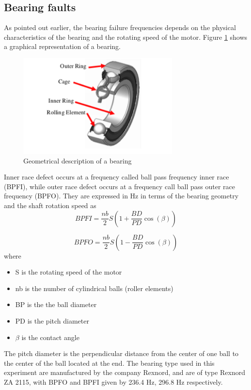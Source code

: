 \documentclass[../Main/thesis.tex]{subfiles}
\begin{document}


\subsection{Bearing faults}
\label{sec:fault}
As pointed out earlier, the bearing failure frequencies depends on the physical characteristics of the bearing and the rotating speed of the motor. Figure \ref{fig:bearing} shows a graphical representation of a bearing.
\begin{figure}[H] %
   \centering
   \includegraphics[width=3.2in]{../fig/bearing}  
   \caption{Geometrical description of a bearing}
   \label{fig:bearing}
\end{figure}
\justify
 Inner race defect occurs at a frequency called ball pass frequency inner race (BPFI), while outer race defect occurs at a frequency call ball pass outer race frequency (BPFO). They are expressed in Hz in terms of the bearing geometry and the shaft rotation speed as 
\begin{equation}\label{eq:bpfi}
BPFI = \frac{nb}{2}S\left( 1 +  \frac{BD}{PD}\cos(\beta)  \right)
\end{equation}

\begin{equation}\label{eq:bpfo}
BPFO = \frac{nb}{2}S\left( 1 -  \frac{BD}{PD}\cos(\beta)  \right)
\end{equation}
where 
\begin{itemize}
\item S is the rotating speed of the motor
\item nb is the number of cylindrical balls (roller elements)
\item BP is the the ball diameter
\item PD is the pitch diameter
\item $\beta$ is the contact angle
\end{itemize}
The pitch diameter is the perpendicular distance from the center of one ball to the center of the ball located at the end.
The bearing type used in this experiment are manufactured by the company Rexnord, and are of type Rexnord ZA 2115, with BPFO and BPFI given by 236.4 Hz, 296.8 Hz respectively. 
\end{document}

